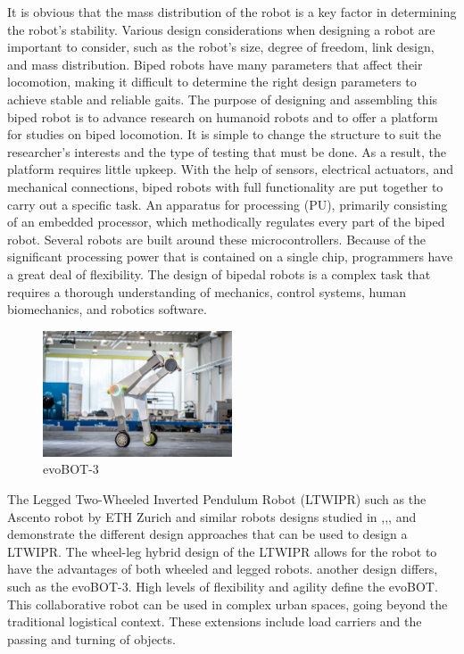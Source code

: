 It is obvious that the mass distribution of the robot is a key factor in determining the robot's stability.
Various design considerations when designing a robot are important to consider, such as the robot's size, degree of freedom, link design, and mass distribution\cite{nath2017design}.
Biped robots have many parameters that affect their locomotion, making it difficult to determine the right design parameters to achieve stable and reliable gaits.
The purpose of designing and assembling this biped robot is to advance research on humanoid robots and to offer a platform for studies on biped locomotion.
It is simple to change the structure to suit the researcher's interests and the type of testing that must be done.
As a result, the platform requires little upkeep.
With the help of sensors, electrical actuators, and mechanical connections, biped robots with full functionality are put together to carry out a specific task.
An apparatus for processing (PU), primarily consisting of an embedded processor, which methodically regulates every part of the biped robot.
Several robots are built around these microcontrollers.
Because of the significant processing power that is contained on a single chip, programmers have a great deal of flexibility\cite{madadi2007design}.
 The design of bipedal robots is a complex task that requires a thorough understanding of mechanics, control systems, human biomechanics, and robotics software.

\begin {figure}[h]
\centering
\includegraphics[width=0.5\textwidth]{evoBOT-3}
\caption{evoBOT-3\cite{klokowski2023evobot}}
\label{fig:evoBOT-3}
\end {figure}

The Legged Two-Wheeled Inverted Pendulum Robot (LTWIPR) such as the Ascento robot by ETH Zurich \cite{klemm2019ascento} and similar robots designs studied in \cite{guo2022design},\cite{zhang2022dynamic},\cite{cui2022modeling},\cite{hsu2022implementation} and \cite{xin2020online} demonstrate the different design approaches that can be used to design a LTWIPR. The wheel-leg hybrid design of the LTWIPR allows for the robot to have the advantages of both wheeled and legged robots.
another design differs, such as the evoBOT-3.
High levels of flexibility and agility define the evoBOT. This collaborative robot can be used in complex urban spaces, going beyond the traditional logistical context.
These extensions include load carriers and the passing and turning of objects.\cite{klokowski2023evobot}

